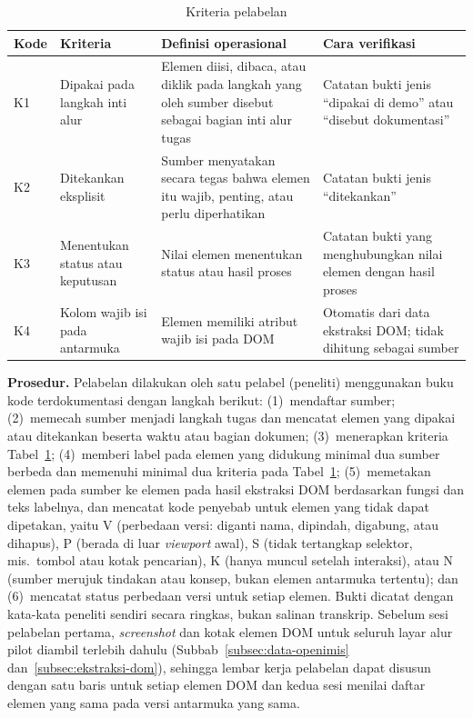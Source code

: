 \begin{table}[H]
  \centering
  \caption{Kriteria pelabelan}
  \label{tab:kriteria}
  \begin{tabularx}{\textwidth}{>{\raggedright\arraybackslash}p{}>{\raggedright\arraybackslash}p{}>{\raggedright\arraybackslash}X>{\raggedright\arraybackslash}p{}}
    \hline
    \textbf{Kode} & \textbf{Kriteria} & \textbf{Definisi operasional} & \textbf{Cara verifikasi} \\
    \hline
    K1 & Dipakai pada langkah inti alur & Elemen diisi, dibaca, atau diklik pada langkah yang oleh sumber disebut sebagai bagian inti alur tugas & Catatan bukti jenis ``dipakai di demo'' atau ``disebut dokumentasi'' \\
    \hline
    K2 & Ditekankan eksplisit & Sumber menyatakan secara tegas bahwa elemen itu wajib, penting, atau perlu diperhatikan & Catatan bukti jenis ``ditekankan'' \\
    \hline
    K3 & Menentukan status atau keputusan & Nilai elemen menentukan status atau hasil proses & Catatan bukti yang menghubungkan nilai elemen dengan hasil proses \\
    \hline
    K4 & Kolom wajib isi pada antarmuka & Elemen memiliki atribut wajib isi pada DOM & Otomatis dari data ekstraksi DOM; tidak dihitung sebagai sumber \\
    \hline
  \end{tabularx}
\end{table}

\textbf{Prosedur.} Pelabelan dilakukan oleh satu pelabel (peneliti) menggunakan buku kode terdokumentasi dengan langkah berikut: (1)~mendaftar sumber; (2)~memecah sumber menjadi langkah tugas dan mencatat elemen yang dipakai atau ditekankan beserta waktu atau bagian dokumen; (3)~menerapkan kriteria Tabel~\ref{tab:kriteria}; (4)~memberi label pada elemen yang didukung minimal dua sumber berbeda dan memenuhi minimal dua kriteria pada Tabel~\ref{tab:kriteria}; (5)~memetakan elemen pada sumber ke elemen pada hasil ekstraksi DOM berdasarkan fungsi dan teks labelnya, dan mencatat kode penyebab untuk elemen yang tidak dapat dipetakan, yaitu V (perbedaan versi: diganti nama, dipindah, digabung, atau dihapus), P (berada di luar \emph{viewport} awal), S (tidak tertangkap selektor, mis.\ tombol atau kotak pencarian), K (hanya muncul setelah interaksi), atau N (sumber merujuk tindakan atau konsep, bukan elemen antarmuka tertentu); dan (6)~mencatat status perbedaan versi untuk setiap elemen. Bukti dicatat dengan kata-kata peneliti sendiri secara ringkas, bukan salinan transkrip. Sebelum sesi pelabelan pertama, \emph{screenshot} dan kotak elemen DOM untuk seluruh layar alur pilot diambil terlebih dahulu (Subbab~\ref{subsec:data-openimis} dan~\ref{subsec:ekstraksi-dom}), sehingga lembar kerja pelabelan dapat disusun dengan satu baris untuk setiap elemen DOM dan kedua sesi menilai daftar elemen yang sama pada versi antarmuka yang sama.

